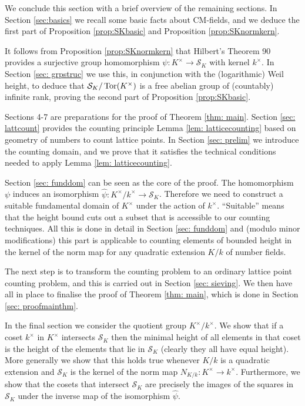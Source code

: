 \documentclass[11pt]{amsart}
\numberwithin{equation}{eqncounter}
\newcommand{\Norm}{N_{K/k}}
\def\Tor{\mathop{\rm Tor}\nolimits}
\def\Sc{\mathcal{S}}
\begin{document}
We conclude this section with a brief overview of the remaining sections.
In Section \ref{sec:basics} we recall some basic facts about CM-fields, and we deduce
the first part of Proposition \ref{prop:SKbasic} and  Proposition \ref{prop:SKnormkern}.

It follows from Proposition \ref{prop:SKnormkern} that Hilbert's Theorem 90 provides a 
surjective group homomorphism $\psi:K^\times \to \Sc_K$ with kernel $k^\times$.
In Section \ref{sec: grpstruc} we use this, in conjunction with the (logarithmic) Weil height, to deduce
that $\Sc_K/\Tor(K^\times)$ is a free abelian group of (countably) infinite rank, proving the
second part of Proposition \ref{prop:SKbasic}. 

Sections 4-7 are preparations
for the proof of Theorem \ref{thm: main}. Section \ref{sec: lattcount} provides the
counting principle Lemma \ref{lem: latticecounting} based on geometry of numbers to count lattice points.
In Section \ref{sec: prelim} we introduce the counting domain, and we prove that it satisfies the 
technical conditions needed to apply Lemma \ref{lem: latticecounting}. 

Section \ref{sec: funddom} can be seen as the core of the proof. The homomorphism $\psi$ induces an isomorphism $\hat{\psi}: K^\times/k^\times \to \Sc_K$. Therefore we need to construct a suitable fundamental domain of $K^\times$ under the
action of $k^\times$. ``Suitable'' means that the height bound cuts out a subset that is accessible 
to our counting techniques. All this is done in detail in Section \ref{sec: funddom} and (modulo minor 
modifications) this part is applicable to counting elements of bounded height in the kernel of the norm map for any quadratic extension $K/k$ of number fields. 

The next  step is to transform the counting problem to an ordinary lattice point counting problem, and this is carried out in Section \ref{sec: sieving}. We then have all in place to finalise the proof of Theorem \ref{thm: main}, which is done in Section \ref{sec: proofmainthm}.

In the final section we consider the  quotient group $K^\times/k^\times$.
We show that if a coset $k^\times$ in $K^\times$
intersects $\Sc_K$ then the
minimal height of all elements in that coset is the height of the elements that lie in $\Sc_K$
(clearly they all have equal height).
More generally we show that this holds true whenever
$K/k$ is a quadratic extension and $\Sc_K$ is the kernel of the norm map $\Norm: K^\times\to k^\times$.
Furthermore, we show that the cosets that intersect $\Sc_K$ are precisely the images of the 
squares in $\Sc_K$ under the inverse map of the isomorphism $\hat{\psi}$. 
\end{document}
